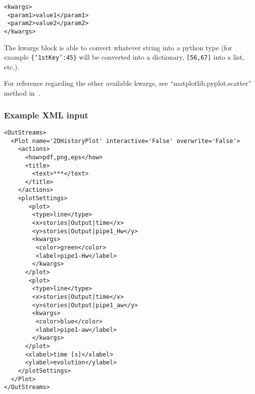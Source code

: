\begin{itemize}
\begin{lstlisting}[style=XML]
<kwargs>
 <param1>value1</param1>
 <param2>value2</param2>
</kwargs>
\end{lstlisting}

  The kwargs block is able to convert whatever string into a python type (for
  example  \texttt{\{`1stKey':45\}} will
  be converted into a dictionary,
   \texttt{[56,67]}  into a list, etc.).

  For reference regarding the other available kwargs, see
  ``matplotlib.pyplot.scatter'' method in~\cite{MatPlotLib}.
\end{itemize}



\subsubsection{Example XML input}
\begin{lstlisting}[style=XML,morekeywords={name,interactive,overwrite}]
<OutStreams>
  <Plot name='2DHistoryPlot' interactive='False' overwrite='False'>
    <actions>
      <how>pdf,png,eps</how>
      <title>
        <text>***</text>
      </title>
    </actions>
    <plotSettings>
       <plot>
        <type>line</type>
        <x>stories|Output|time</x>
        <y>stories|Output|pipe1_Hw</y>
        <kwargs>
         <color>green</color>
         <label>pipe1-Hw</label>
        </kwargs>
      </plot>
       <plot>
        <type>line</type>
        <x>stories|Output|time</x>
        <y>stories|Output|pipe1_aw</y>
        <kwargs>
         <color>blue</color>
         <label>pipe1-aw</label>
        </kwargs>
      </plot>
      <xlabel>time [s]</xlabel>
      <ylabel>evolution</ylabel>
    </plotSettings>
  </Plot>
</OutStreams>
\end{lstlisting}
